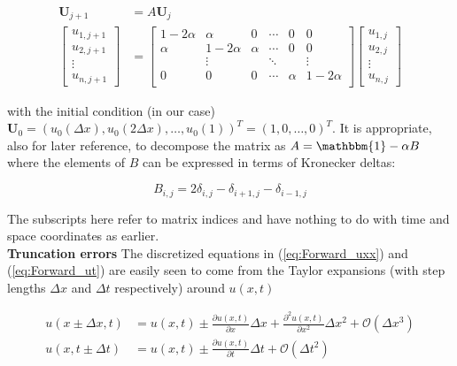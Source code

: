 \documentclass[a4paper, 11pt, notitlepage,english]{article}
\newcommand{\id}{\mathbbm{1}}
\begin{document}
\begin{align}
\boldsymbol{U}_{j+1} &= A \boldsymbol{U}_j \\
\begin{bmatrix}
u_{1,j+1} \\ u_{2,j+1} \\ \vdots \\ u_{n,j+1}
\end{bmatrix}
&=
\begin{bmatrix}
 1-2\alpha & \alpha & 0 & \cdots & 0 & 0 \\
 \alpha & 1-2\alpha & \alpha & \cdots & 0 & 0 \\
  & \vdots & & \ddots & & \vdots \\
 0 & 0 & 0 & \cdots & \alpha & 1-2\alpha \\
\end{bmatrix}
\begin{bmatrix}
u_{1,j} \\ u_{2,j} \\ \vdots \\ u_{n,j}
\end{bmatrix}
\label{eq:Forward_Euler_matrix}
\end{align}

with the initial condition (in our case) $\boldsymbol{U}_0 = ( u_0(\Delta x), u_0(2\Delta x), \dots, u_0(1))^T = (1,0,\dots,0)^T$. It is appropriate, also for later reference, to decompose the matrix as $A = \id - \alpha B$ where the elements of $B$ can be expressed in terms of Kronecker deltas: 

\begin{equation}
B_{i,j} = 2\delta_{i,j}-\delta_{i+1,j}-\delta_{i-1,j}
\label{eq:Matrix_B}
\end{equation}

The subscripts here refer to matrix indices and have nothing to do with time and space coordinates as earlier. \\

\textbf{Truncation errors} \newline
The discretized equations in (\ref{eq:Forward_uxx}) and (\ref{eq:Forward_ut}) are easily seen to come from the Taylor expansions (with step lengths $\Delta x$ and $\Delta t$ respectively) around $u(x,t)$ 

\begin{align}
u(x\pm\Delta x,t) &= u(x,t) \pm \frac{\partial u(x,t)}{\partial x}\Delta x + \frac{\partial^2 u(x,t)}{\partial x^2}\Delta x^2 + \mathcal{O}(\Delta x^3)
\label{eq:Forward_Euler_expansions1} \\
u(x,t\pm \Delta t) &= u(x,t) \pm \frac{\partial u(x,t)}{\partial t}\Delta t + \mathcal{O}(\Delta t^2)
\label{eq:Forward_Euler_expansions2}
\end{align}
\end{document}

